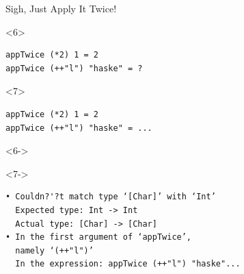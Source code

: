 \documentclass{beamer}
\begin{document}
\begin{frame}[fragile]{Sigh, Just Apply It Twice!}
\begin{onlyenv}<6>
\begin{verbatim}
appTwice (*2) 1 = 2
appTwice (++"l") "haske" = ?
\end{verbatim}
\end{onlyenv}

\begin{onlyenv}<7>
\begin{verbatim}
appTwice (*2) 1 = 2
appTwice (++"l") "haske" = ...
\end{verbatim}
\end{onlyenv}

\begin{onlyenv}<6->
\begin{uncoverenv}<7->
\begin{alertbox}
\begin{verbatim}
• Couldn?'?t match type ‘[Char]’ with ‘Int’
  Expected type: Int -> Int
  Actual type: [Char] -> [Char]
• In the first argument of ‘appTwice’,
  namely ‘(++"l")’
  In the expression: appTwice (++"l") "haske"...
\end{verbatim}
\end{alertbox}
\end{uncoverenv}
\end{onlyenv}

\end{frame}





\end{document}

